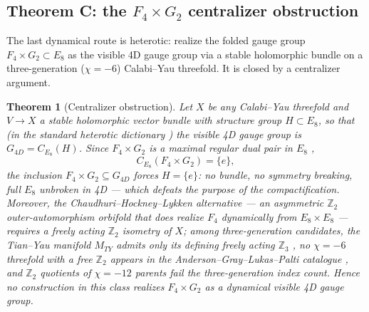 \documentclass[11pt,a4paper]{amsart}
\newtheorem{maintheorem}{Theorem}
\theoremstyle{definition}
\theoremstyle{remark}
\newcommand{\bbZ}{\mathbb{Z}}
\begin{document}
\subsection{Theorem C: the $F_4 \times G_2$ centralizer obstruction}

The last dynamical route is heterotic: realize the folded gauge group
$F_4 \times G_2 \subset E_8$ as the visible 4D gauge group via a stable
holomorphic bundle on a three-generation ($\chi = -6$) Calabi--Yau
threefold. It is closed by a centralizer argument.

\begin{maintheorem}[Centralizer obstruction]\label{thm:centralizer}
Let $X$ be any Calabi--Yau threefold and $V \to X$ a stable holomorphic
vector bundle with structure group $H \subset E_8$, so that (in the standard
heterotic dictionary \cite{Witten1985}) the visible 4D gauge group is
$G_{4D} = C_{E_8}(H)$. Since $F_4 \times G_2$ is a maximal regular dual
pair in $E_8$ \cite{Slansky1981},
\[ C_{E_8}(F_4 \times G_2) = \{e\}, \]
the inclusion $F_4 \times G_2 \subseteq G_{4D}$ forces $H = \{e\}$: no
bundle, no symmetry breaking, full $E_8$ unbroken in 4D --- which defeats
the purpose of the compactification. Moreover, the
Chaudhuri--Hockney--Lykken alternative \cite{CHL1995} --- an asymmetric
$\bbZ_2$ outer-automorphism orbifold that does realize $F_4$ dynamically
from $E_8 \times E_8$ --- requires a freely acting $\bbZ_2$ isometry of $X$;
among three-generation candidates, the Tian--Yau manifold $M_{TY}$
\cite{TianYau1987} admits only its defining freely acting $\bbZ_3$
\cite{GKMR1986}, no $\chi = -6$ threefold with a free $\bbZ_2$ appears in
the Anderson--Gray--Lukas--Palti catalogue \cite{AGLP2011}, and $\bbZ_2$
quotients of $\chi = -12$ parents fail the three-generation index count.
Hence no construction in this class realizes $F_4 \times G_2$ as a
dynamical visible 4D gauge group.
\end{maintheorem}
\end{document}
